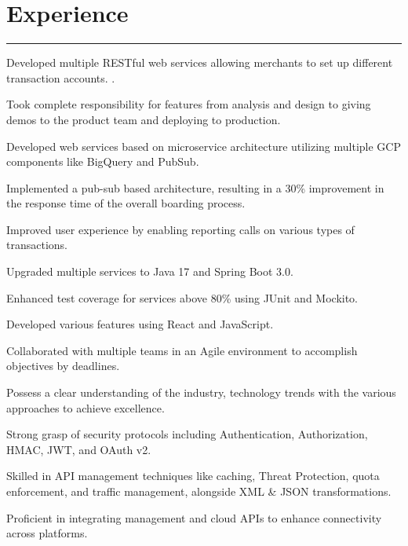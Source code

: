 \documentclass[]{deedy-resume-reversed}
\newcommand{\mysection}[2]{%
    \section{#1\hspace{0.5em}#2}
}
\begin{document}
\begin{minipage}[t]{0.60\textwidth}


\mysection{\faBriefcase}{Experience}
\rule{\textwidth}{0.4pt}
\vspace{\topsep} %
\begin{tightemize}
\item Developed multiple RESTful web services allowing merchants to set up different transaction accounts. .
\item Took complete responsibility for features from analysis and design to giving demos to the product team and deploying to production.
\item Developed web services based on microservice architecture utilizing multiple GCP components like BigQuery and PubSub. 
\item 
Implemented a pub-sub based architecture, resulting in a 30\% improvement in the response time of the overall boarding process.
\item Improved user experience by enabling reporting calls on various types of transactions. 
\item Upgraded multiple services to Java 17 and Spring Boot 3.0. 
\item Enhanced test coverage for services above 80\% using JUnit and Mockito.  
\item Developed various features using React and JavaScript. 
\item Collaborated with multiple teams in an Agile environment to accomplish objectives by deadlines. 
\end{tightemize}
\sectionsep

\descript{ }
\begin{tightemize}
\item Possess a clear understanding of the industry, technology trends with the various approaches to achieve excellence.
\item Strong grasp of security protocols including Authentication, Authorization, HMAC, JWT, and OAuth v2.
\item Skilled in API management techniques like caching, Threat Protection, quota enforcement, and traffic management, alongside XML \& JSON transformations.
\item Proficient in integrating management and cloud APIs to enhance connectivity across platforms. 
\end{tightemize}
\sectionsep


\end{minipage}
\end{document}
